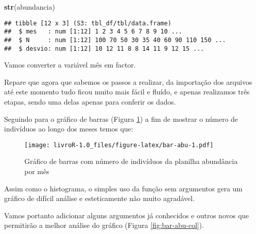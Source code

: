 \documentclass[titlepage, oneside, openany, a4paper]{book}
\newenvironment{Shaded}{\begin{snugshade}}{\end{snugshade}}
\newcommand{\KeywordTok}[1]{\textcolor[rgb]{0.13,0.29,0.53}{\textbf{#1}}}
\newcommand{\NormalTok}[1]{#1}
\newcommand{\OperatorTok}[1]{\textcolor[rgb]{0.81,0.36,0.00}{\textbf{#1}}}
\newcommand{\StringTok}[1]{\textcolor[rgb]{0.31,0.60,0.02}{#1}}
\begin{document}
\begin{Shaded}
\begin{Highlighting}[]
\KeywordTok{str}\NormalTok{(abundancia)}
\end{Highlighting}
\end{Shaded}

\begin{verbatim}
## tibble [12 x 3] (S3: tbl_df/tbl/data.frame)
##  $ mes   : num [1:12] 1 2 3 4 5 6 7 8 9 10 ...
##  $ N     : num [1:12] 100 70 50 30 35 40 60 90 110 150 ...
##  $ desvio: num [1:12] 10 12 11 8 8 14 11 9 12 15 ...
\end{verbatim}

Vamos converter a variável mês em factor.

\begin{Shaded}
\end{Shaded}

Repare que agora que sabemos os passos a realizar, da importação dos arquivos até este momento tudo ficou muito mais fácil e fluído, e apenas realizamos três etapas, sendo uma delas apenas para conferir os dados.

Seguindo para o gráfico de barras (Figura \ref{fig:bar-abu}) a fim de mostrar o número de indivíduos ao longo dos meses temos que:

\begin{Shaded}
\end{Shaded}

\begin{figure}
\centering
\texttt{[image: livroR-1.0\_files/figure-latex/bar-abu-1.pdf]}
\caption{\label{fig:bar-abu}Gráfico de barras com número de indivíduos da planilha abundância por mês}
\end{figure}

Assim como o histograma, o simples uso da função sem argumentos gera um gráfico de difícil análise e esteticamente não muito agradável.

Vamos portanto adicionar alguns argumentos já conhecidos e outros novos que permitirão a melhor análise do gráfico (Figura \ref{fig:bar-abu-col}).
\end{document}
